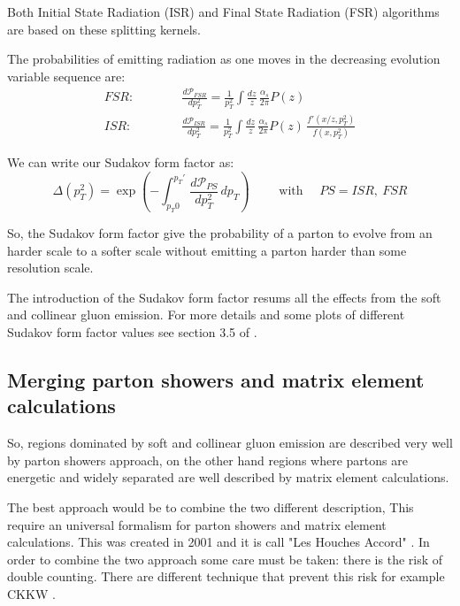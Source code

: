 Both Initial State Radiation (ISR) and Final State Radiation (FSR) algorithms are based on these splitting kernels.

The probabilities of emitting radiation as one moves in the decreasing evolution variable sequence are:
\begin{align}
	FSR: \qquad\quad & \frac{d\mathcal{P}_{FSR}}{dp_T^2} = \frac{1}{p_T^2}\displaystyle\int \frac{dz}{z}\,\frac{\alpha_s}{2\pi}P(z)\label{eq:FSR1}\\
	ISR: \qquad\quad & \frac{d\mathcal{P}_{ISR}}{dp_T^2} = \frac{1}{p_T^2}\displaystyle\int \frac{dz}{z}\,\frac{\alpha_s}{2\pi}P(z)\,\frac{f'(x/z,p_T^2)}{f(x,p_T^2)}\label{eq:ISR1}
\end{align}

We can write our Sudakov form factor as:
\begin{equation}
	\Delta(p_T^2)=\exp\left( -\displaystyle\int_{p_T0}^{p_T'} \frac{d\mathcal{P}_{PS}}{dp_T^2} \,dp_T\right) \qquad\text{ with } \quad PS=ISR,\ FSR
	\label{eq:sudakovFormFactor}
\end{equation}

So, the Sudakov form factor give the probability of a parton to evolve from an harder scale to a softer scale without emitting a parton harder than some resolution scale. 

The introduction of the Sudakov form factor resums all the effects from the soft and collinear gluon emission. For more details and some plots of different Sudakov form factor values see section 3.5 of \cite{Campbell2006}.

\subsection{Merging parton showers and matrix element calculations}

So, regions dominated by soft and collinear gluon emission are described very well by parton showers approach, on the other hand regions where partons are  energetic and widely separated are well described by matrix element calculations. 

The best approach would be to combine the two different description, This require an universal formalism for parton showers and matrix element calculations. This was created in 2001 and it is call "Les Houches Accord" \cite{LesHouchesAccord}.
In order to combine the two approach some care must be taken: there is the risk of double counting. There are different technique that prevent this risk for example CKKW \cite{CKKW2001}.

